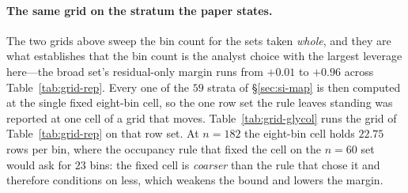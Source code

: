 \paragraph{The same grid on the stratum the paper states.} The two grids above sweep the bin count
for the sets taken \emph{whole}, and they are what establishes that the bin count is the analyst
choice with the largest leverage here---the broad set's residual-only margin runs from $+0.01$ to
$+0.96$ across Table~\ref{tab:grid-rep}. Every one of the $59$ strata of \S\ref{sec:si-map} is then
computed at the single fixed eight-bin cell, so the one row set the rule leaves standing was
reported at one cell of a grid that moves. Table~\ref{tab:grid-glycol} runs the grid of
Table~\ref{tab:grid-rep} on that row set. At $n{=}182$ the eight-bin cell holds $22.75$ rows per
bin, where the occupancy rule that fixed the cell on the $n{=}60$ set would ask for $23$ bins: the
fixed cell is \emph{coarser} than the rule that chose it and therefore conditions on less, which
weakens the bound and lowers the margin.

